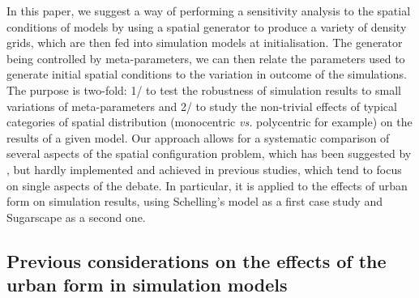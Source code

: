 \documentclass[Royal,sageh,times]{sagej}
\begin{document}
In this paper, we suggest a way of performing a sensitivity analysis to the spatial conditions of models by using a spatial generator to produce a variety of density grids, which are then fed into simulation models at initialisation. The generator being controlled by meta-parameters, we can then relate the parameters used to generate initial spatial conditions to the variation in outcome of the simulations. The purpose is two-fold: 1/ to test the robustness of simulation results to small variations of meta-parameters and 2/ to study the non-trivial effects of typical categories of spatial distribution (monocentric \textit{vs.} polycentric for example) on the results of a given model. Our approach allows for a systematic comparison of several aspects of the spatial configuration problem, which has been suggested by \citet{filatova2013spatial}, but hardly implemented and achieved in previous studies, which tend to focus on single aspects of the debate. In particular, it is applied to the effects of urban form on simulation results, using Schelling's model as a first case study and Sugarscape as a second one. 

\subsection{Previous considerations on the effects of the urban form in simulation models}


\end{document}
